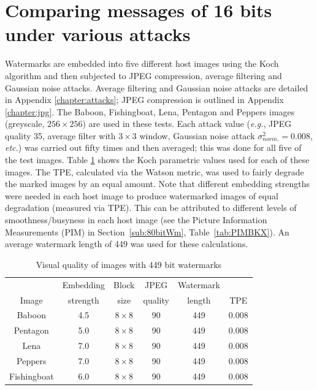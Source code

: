 \documentclass[12pt]{report}
\begin{document}
\section{Comparing messages of 16 bits under various attacks}
\label{sec:BK}
Watermarks are embedded into five different host images using the Koch algorithm and
then subjected to JPEG compression, average filtering and Gaussian noise attacks.
Average filtering and
Gaussian noise attacks are detailed in Appendix \ref{chapter:attacks};
JPEG compression is outlined in Appendix \ref{chapter:jpg}.
The Baboon, Fishingboat, Lena, Pentagon and Peppers images (greyscale, $256 \times 256$) are used in these
tests. Each attack value (\emph{e.g.}, JPEG quality 35, average filter with $3\times 3$ window, 
Gaussian noise attack $\sigma_{norm.}^{2}=0.008$, \emph{etc.}) was carried out fifty
times and then averaged; this was done for all five of the test images.
Table \ref{tab:kochBaudTPEBK} shows the Koch parametric values used for each of these images.
The TPE, calculated via the Watson
metric, was used to fairly degrade the marked images by an equal amount. Note that different 
embedding strengths were needed in each host image to produce 
watermarked images of equal degradation (measured via TPE). 
This can be attributed to different levels
of smoothness/busyness in each host image (see the Picture Information Measurements (PIM) in Section~\ref{sub:80bitWm}, Table~\ref{tab:PIMBKX}).
An average watermark length of 449 was used
for these calculations. 
\begin{table}[htb]
\scriptsize
        \begin{center}
                \begin{tabular}{|c|c|c|c|c|c|} \hline
			       & Embedding 			& Block	  		& JPEG			&Watermark		& \\
                Image    	& strength  			& size      		& quality 		&length			& TPE \\ \hline
                Baboon 		& 4.5 				& $8 \times 8$		& 90			& 449			& 0.008 \\ \hline
                Pentagon	& 5.0 				& $8 \times 8$		& 90			& 449			& 0.008 \\ \hline
                Lena		& 7.0 				& $8 \times 8$		& 90			& 449			& 0.008 \\ \hline
                Peppers		& 7.0 				& $8 \times 8$		& 90			& 449			& 0.008 \\ \hline
                Fishingboat	& 6.0 				& $8 \times 8$		& 90			& 449			& 0.008	\\ \hline
                \end{tabular}
                \caption{Visual quality of images with 449 bit watermarks}
                \label{tab:kochBaudTPEBK}
        \end{center}
\normalsize
\end{table}
\end{document}

